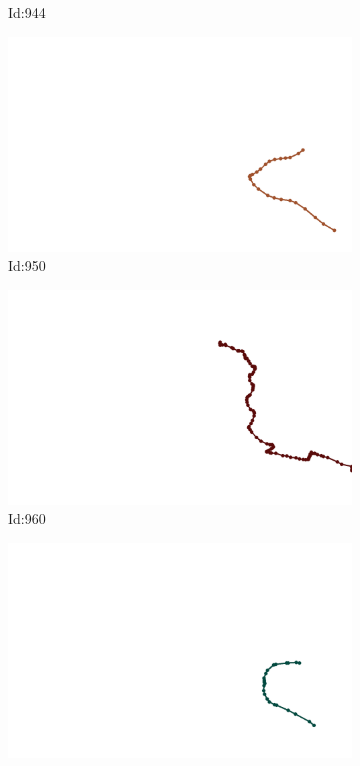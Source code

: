 \documentclass[12pt,twoside]{report}
\begin{document}
\begin{figure}
\begin{subfigure}[b]{0.20\textwidth}
\caption{Id:944}
\end{subfigure}
\begin{subfigure}[b]{0.20\textwidth}
\centering
\includegraphics[width=\textwidth]{../trajectories/950.png}
\caption{Id:950}
\end{subfigure}
\begin{subfigure}[b]{0.20\textwidth}
\centering
\includegraphics[width=\textwidth]{../trajectories/960.png}
\caption{Id:960}
\end{subfigure}
\begin{subfigure}[b]{0.20\textwidth}
\centering
\includegraphics[width=\textwidth]{../trajectories/965.png}

\end{subfigure}
\end{figure}
\end{document}
